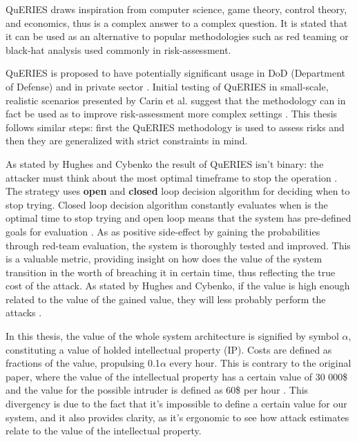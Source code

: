 QuERIES draws inspiration from computer science, game theory, control
theory, and economics, thus is a complex answer to a complex
question. It is stated that it can be used as an alternative to
popular methodologies such as red teaming or black-hat analysis used
commonly in risk-assessment. \cite{carin2008cybersecurity}

QuERIES is proposed to have potentially significant usage in DoD
(Department of Defense) and in private sector
\cite{carin2008cybersecurity}. Initial testing of QuERIES in
small-scale, realistic scenarios presented by Carin et al. suggest
that the methodology can in fact be used as to improve risk-assessment
more complex settings \cite{carin2008cybersecurity}. This thesis
follows similar steps: first the QuERIES methodology is used to assess
risks and then they are generalized with strict constraints in mind.

As stated by Hughes and Cybenko the result of QuERIES isn't binary:
the attacker must think about the most optimal timeframe to stop the
operation \cite{hughes2013quantitative}. The strategy uses
\textbf{open} and \textbf{closed} loop decision algorithm for deciding
when to stop trying. Closed loop decision algorithm constantly
evaluates when is the optimal time to stop trying and open loop means
that the system has pre-defined goals for evaluation
\cite{carin2008cybersecurity}. As as positive side-effect by gaining
the probabilities through red-team evaluation, the system is
thoroughly tested and improved. This is a valuable metric, providing
insight on how does the value of the system transition in the worth of
breaching it in certain time, thus reflecting the true cost of the
attack. As stated by Hughes and Cybenko, if the value is high enough
related to the value of the gained value, they will less probably
perform the attacks \cite{hughes2013quantitative}.

In this thesis, the value of the whole system architecture is
signified by symbol $\alpha$, constituting a value of holded intellectual
property (IP). Costs are defined as fractions of the value, propulsing
0.1$\alpha$ every hour. This is contrary to the original paper, where the
value of the intellectual property has a certain value of 30 000\$ and
the value for the possible intruder is defined as 60\$ per hour
\cite{carin2008cybersecurity}. This divergency is due to the fact
that it's impossible to define a certain value for our system,
and it also provides clarity, as it's ergonomic to see how attack
estimates relate to the value of the intellectual property. 


